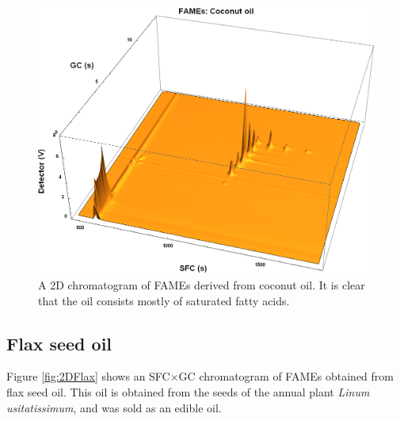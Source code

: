 \begin{figure}
\centering
\includegraphics[width=\textwidth]{Figures/Coconut.png}
\decoRule

\caption[SFC×GC of coconut oil]{A 2D chromatogram of FAMEs derived from
coconut oil. It is clear that the oil consists mostly of saturated fatty
acids.}

\label{fig:2DCoconut}
\end{figure}

\subsection{Flax seed oil}

Figure \ref{fig:2DFlax} shows an SFC×GC chromatogram of FAMEs obtained from flax
seed oil. This oil is obtained from the seeds of the annual plant \textit{Linum
usitatissimum}, and was sold as an edible oil.

